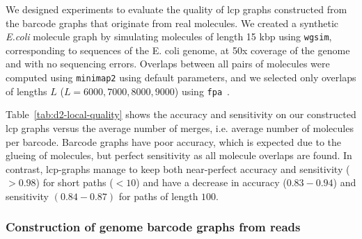 \documentclass[a4paper,UKenglish,cleveref, autoref, thm-restate,authorcolumns]{lipics-v2019}
\begin{document}
We designed experiments to evaluate the quality of lcp graphs constructed from the barcode graphs that originate from real molecules. We created a synthetic \emph{E.coli} molecule graph by simulating molecules of length 15 kbp using \texttt{wgsim}, corresponding to sequences of the E. coli genome, at 50x coverage of the genome and with no sequencing errors. Overlaps between all pairs of molecules were computed using \texttt{minimap2} using default parameters, and we selected only overlaps of lengths $L$ ($L=6000,7000,8000,9000$) using \texttt{fpa}~\cite{fpa}. 





Table~\ref{tab:d2-local-quality} shows the accuracy and sensitivity on our constructed lcp graphs versus the average number of merges, i.e. average number of molecules per barcode. Barcode graphs have poor accuracy, which is expected due to the glueing of molecules, but perfect sensitivity as all molecule overlaps are found. In contrast, lcp-graphs manage to keep both near-perfect accuracy and sensitivity ($>0.98$) for short paths ($<10$) and have a decrease in accuracy ($0.83-0.94$) and sensitivity $(0.84-0.87)$ for paths of length $100$.


\subsubsection*{Construction of genome barcode graphs from reads \label{sec:bg_reads}}
\end{document}
